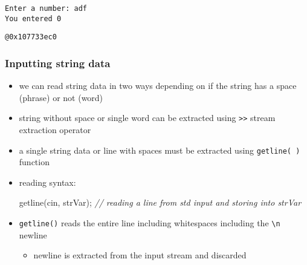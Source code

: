 \documentclass[11pt]{article}
\makeatletter
\providecommand{\tightlist}{%
      \setlength{\itemsep}{0pt}\setlength{\parskip}{0pt}}
\newenvironment{Shaded}{}{}
\newcommand{\CommentTok}[1]{\textcolor[rgb]{0.38,0.63,0.69}{\textit{{#1}}}}
\newcommand{\NormalTok}[1]{{#1}}
\newcommand{\OperatorTok}[1]{\textcolor[rgb]{0.40,0.40,0.40}{{#1}}}
\newcommand{\boxspacing}{\kern\kvtcb@left@rule\kern\kvtcb@boxsep}
\newcommand{\prompt}[4]{
        {\ttfamily\llap{{\color{#2}[#3]:\hspace{3pt}#4}}\vspace{-\baselineskip}}
    }
\makeatother
\begin{document}
    \begin{Verbatim}[commandchars=\\\{\}]
Enter a number: adf
You entered 0
    \end{Verbatim}

            \begin{tcolorbox}[breakable, size=fbox, boxrule=.5pt, pad at break*=1mm, opacityfill=0]
\prompt{Out}{outcolor}{16}{\boxspacing}
\begin{Verbatim}[commandchars=\\\{\}]
@0x107733ec0
\end{Verbatim}
\end{tcolorbox}
        
    \hypertarget{inputting-string-data}{%
\subsubsection{Inputting string data}\label{inputting-string-data}}

\begin{itemize}
\item
  we can read string data in two ways depending on if the string has a
  space (phrase) or not (word)
\item
  string without space or single word can be extracted using
  \texttt{\textgreater{}\textgreater{}} stream extraction operator
\item
  a single string data or line with spaces must be extracted using
  \texttt{getline(\ )} function
\item
  reading syntax:

\begin{Shaded}
\begin{Highlighting}[]
\NormalTok{getline}\OperatorTok{(}\NormalTok{cin}\OperatorTok{,}\NormalTok{ strVar}\OperatorTok{);} \CommentTok{// reading a line from std input and storing into strVar}
\end{Highlighting}
\end{Shaded}
\item
  \texttt{getline()} reads the entire line including whitespaces
  including the \texttt{\textbackslash{}n} newline

  \begin{itemize}
  \tightlist
  \item
    newline is extracted from the input stream and discarded
  \end{itemize}
\end{itemize}
\end{document}
